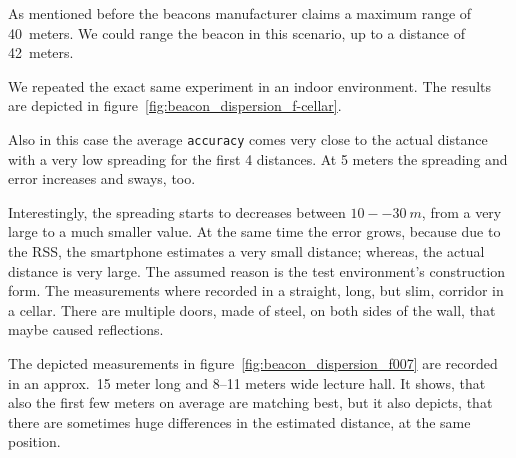 As mentioned before the beacons manufacturer claims a maximum range of 40~meters. We could range the beacon in this scenario, up to a distance of 42~meters.

We repeated the exact same experiment in an indoor environment. The results are depicted in figure~\ref{fig:beacon_dispersion_f-cellar}.

Also in this case the average \texttt{accuracy} comes very close to the actual distance with a very low spreading for the first 4 distances. At 5 meters the spreading and error increases and sways, too.

Interestingly, the spreading starts to decreases between $10--30~m$, from a very large to a much smaller value. At the same time the error grows, because due to the \acs{RSS}, the smartphone estimates a very small distance; whereas, the actual distance is very large. The assumed reason is the test environment's construction form. The measurements where recorded in a straight, long, but slim, corridor in a cellar. There are multiple doors, made of steel, on both sides of the wall, that maybe caused reflections.

The depicted measurements in figure~\ref{fig:beacon_dispersion_f007} are recorded in an approx.\ 15 meter long and 8--11 meters wide lecture hall. It shows, that also the first few meters on average are matching best, but it also depicts, that there are sometimes huge differences in the estimated distance, at the same position.

